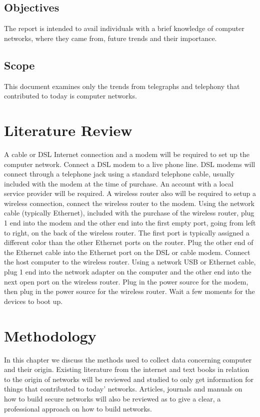 ﻿\documentclass[10]{article}
\begin{document}
\subsection{Objectives}
The report is intended to avail individuals with a brief knowledge of computer networks, where they came from, future trends and their importance.

\subsection{Scope}
This document examines only the trends from telegraphs and telephony that contributed to today is computer networks.

\section{Literature Review}
A cable or DSL Internet connection and a modem will be required to set up the computer network. Connect a DSL modem to a live phone line. DSL modems will connect through a telephone jack using a standard telephone cable, usually included with the modem at the time of purchase. An account with a local service provider will be required.
 A wireless router also will be required to setup a wireless connection, connect the wireless router to the modem. Using the network cable (typically Ethernet), included with the purchase of the wireless router, plug 1 end into the modem and the other end into the first empty port, going from left to right, on the back of the wireless router. The first port is typically assigned a different color than the other Ethernet ports on the router. Plug the other end of the Ethernet cable into the Ethernet port on the DSL or cable modem. Connect the host computer to the wireless router. Using a network USB or Ethernet cable, plug 1 end into the network adapter on the computer and the other end into the next open port on the wireless router. Plug in the power source for the modem, then plug in the power source for the wireless router. Wait a few moments for the devices to boot up.


\section{Methodology}
In this chapter we discuss the methods used to collect data concerning computer and their origin. Existing literature from the internet and text books in relation to the origin of networks will be reviewed and studied to only get information for things that contributed to today’ networks.
Articles, journals and manuals on how to build secure networks will also be reviewed as to give a clear, a professional approach on how to build networks.
\end{document}
